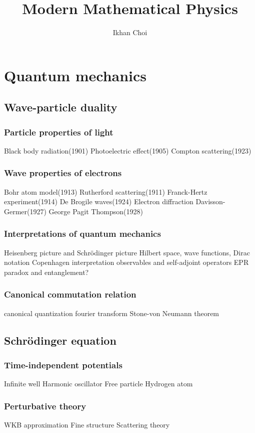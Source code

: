 \documentclass{../note}
\begin{document}
\title{Modern Mathematical Physics}
\author{Ikhan Choi}
\maketitle
\tableofcontents

\part{Quantum mechanics}
\chapter{Wave-particle duality}
\section{Particle properties of light}
Black body radiation(1901)
Photoelectric effect(1905)
Compton scattering(1923)
\section{Wave properties of electrons}
Bohr atom model(1913)
	Rutherford scattering(1911)
	Franck-Hertz experiment(1914)
De Brogile waves(1924)
Electron diffraction
	Davisson-Germer(1927)
	George Pagit Thompson(1928)
\section{Interpretations of quantum mechanics}
Heisenberg picture and Schr\"odinger picture
Hilbert space, wave functions, Dirac notation
	Copenhagen interpretation
observables and self-adjoint operators
EPR paradox and entanglement?
\section{Canonical commutation relation}
canonical quantization
fourier transform
Stone-von Neumann theorem

\chapter{Schr\"odinger equation}
\section{Time-independent potentials}
Infinite well
Harmonic oscillator
Free particle
Hydrogen atom
\section{Perturbative theory}
WKB approximation
Fine structure
Scattering theory
\end{document}
